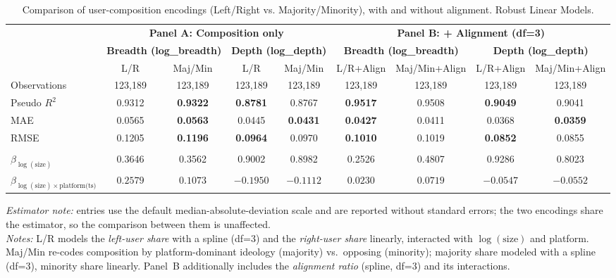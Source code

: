 \documentclass[letterpaper]{article} %
\newcommand{\rev}[1]{{\color{blue}#1}}
\begin{document}
\begin{table}[t]
\centering
\caption{Comparison of user-composition encodings (Left/Right vs. Majority/Minority), with and without alignment. Robust Linear Models.}
\label{tab:si_comp_encoding_rlm_full}
\scriptsize
\renewcommand{\arraystretch}{1.25}
\setlength{\tabcolsep}{3pt}

\begin{tabular}{lcccccccc}
\hline
& \multicolumn{4}{c}{\textbf{Panel A: Composition only}} & \multicolumn{4}{c}{\textbf{Panel B: + Alignment (df=3)}}\\
\cline{2-9}
& \multicolumn{2}{c}{\textbf{Breadth (log\_breadth)}} & \multicolumn{2}{c}{\textbf{Depth (log\_depth)}} & \multicolumn{2}{c}{\textbf{Breadth (log\_breadth)}} & \multicolumn{2}{c}{\textbf{Depth (log\_depth)}}\\
\cline{2-9}
& L/R & Maj/Min & L/R & Maj/Min & L/R+Align & Maj/Min+Align & L/R+Align & Maj/Min+Align \\
\hline
Observations & 123{,}189 & 123{,}189 & 123{,}189 & 123{,}189 & 123{,}189 & 123{,}189 & 123{,}189 & 123{,}189 \\
Pseudo $R^{2}$ & 0.9312 & \textbf{0.9322} & \textbf{0.8781} & 0.8767 & \textbf{0.9517} & 0.9508 & \textbf{0.9049} & 0.9041 \\
MAE & 0.0565 & \textbf{0.0563} & 0.0445 & \textbf{0.0431} & \textbf{0.0427} & 0.0411 & 0.0368 & \textbf{0.0359} \\
RMSE & 0.1205 & \textbf{0.1196} & \textbf{0.0964} & 0.0970 & \textbf{0.1010} & 0.1019 & \textbf{0.0852} & 0.0855 \\
\\
$\beta_{\log(\text{size})}$
& 0.3646 & 0.3562 & 0.9002 & 0.8982 & 0.2526 & 0.4807 & 0.9286 & 0.8023 \\
$\beta_{\log(\text{size})\times \text{platform(ts)}}$
& $0.2579$ & $0.1073$ & $-0.1950$ & $-0.1112$ & $0.0230$ & $0.0719$ & $-0.0547$ & $-0.0552$ \\
\hline
\end{tabular}
\rev{\textit{Estimator note:} entries use the default median-absolute-deviation scale and are reported without standard errors; the two encodings share the estimator, so the comparison between them is unaffected.}\\


\vspace{0.75ex}
\footnotesize
\textit{Notes:}
L/R models the \emph{left-user share} with a spline (df=3) and the \emph{right-user share} linearly, interacted with $\log(\text{size})$ and platform.
Maj/Min re-codes composition by platform-dominant ideology (majority) vs.\ opposing (minority); majority share modeled with a spline (df=3), minority share linearly.
Panel~B additionally includes the \emph{alignment ratio} (spline, df=3) and its interactions.
\end{table}
\end{document}
